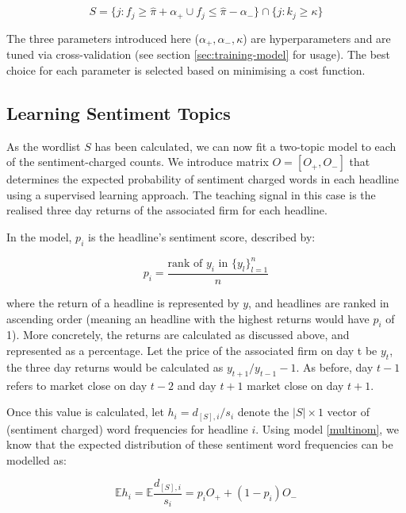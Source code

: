 \begin{equation}
S = \{j : f_j \ge \hat \pi + \alpha_+ \cup f_j \le \hat \pi - \alpha_- \} \cap  \{ j : k_j \ge \kappa \}
\end{equation}

\noindent
The three parameters introduced here ($\alpha_+, \alpha_-, \kappa$) are hyperparameters and are tuned via cross-validation (see section \ref{sec:training-model} for usage). The best choice for each parameter is selected based on minimising a cost function.

\subsection{Learning Sentiment Topics}
\label{sub:learn-sentiment}
As the wordlist $S$ has been calculated, we can now fit a two-topic model to each of the sentiment-charged counts. We introduce matrix $O = [O_+,O_-]$ that determines the expected probability of sentiment charged words in each headline using a supervised learning approach. The teaching signal in this case is the realised three day returns of the associated firm for each headline.

In the model, $p_i$ is the headline's sentiment score, described by:

\begin{equation}
p_i = \frac{\text{rank of } y_i \text{ in } \{y_l\}_{l=1}^n}{n}
\label{sentiment}
\end{equation}

\noindent
where the return of a headline is represented by $y$, and headlines are ranked in ascending order (meaning an headline with the highest returns would have $p_i$ of 1). More concretely, the returns are calculated as discussed above, and represented as a percentage. Let the price of the associated firm on day t be $y_t$, the three day returns would be calculated as $y_{t+1}/y_{t-1} - 1$. As before, day $t-1$ refers to market close on day $t-2$ and day $t+1$ market close on day $t+1$.

Once this value is calculated, let $h_i = d_{[S],i}/s_i$ denote the $|S| \times 1$ vector of (sentiment charged) word frequencies for headline $i$. Using model \ref{multinom}, we know that the expected distribution of these sentiment word frequencies can be modelled as:

\begin{equation}
\mathbb{E}h_i = \mathbb{E}\frac{d_{[S],i}}{s_i} = p_i O_+ + (1-p_i)O_-
\end{equation}

